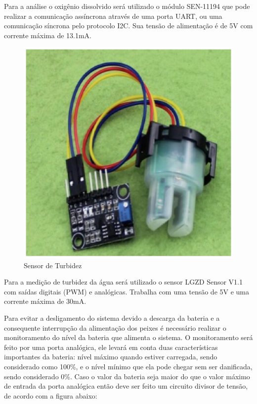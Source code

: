 Para a análise o oxigênio dissolvido será utilizado o módulo SEN-11194 que pode realizar a comunicação assíncrona através de uma porta UART, ou uma comunicação síncrona pelo protocolo I2C. Sua tensão de alimentação é de 5V com corrente máxima de 13.1mA.


\begin{figure}[H]
 \centering
   \includegraphics[keepaspectratio=true,scale=0.8]{figuras/sesortubidez.eps}
 \caption{Sensor de Turbidez}
 \label{sensor_tubidez}
\end{figure}

Para a medição de turbidez da água será utilizado o sensor LGZD Sensor V1.1 com saídas digitais (PWM) e analógicas. Trabalha com uma tensão de 5V e uma corrente máxima de 30mA.


Para evitar a desligamento do sistema devido a descarga da bateria e a consequente interrupção da alimentação dos peixes é necessário realizar o monitoramento do nível da bateria que alimenta o sistema. O monitoramento será feito por uma porta analógica, ele levará em conta duas características importantes da bateria: nível máximo quando estiver carregada, sendo considerado como 100\%, e o nível mínimo que ela pode chegar sem ser danificada, sendo considerado 0\%. Caso o valor da bateria seja maior do que o valor máximo de entrada da porta analógica então deve ser feito um circuito divisor de tensão, de acordo com a figura abaixo:


